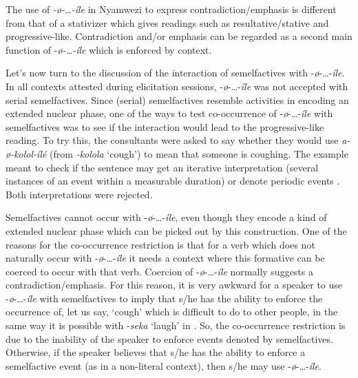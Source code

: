 \documentclass[output=paper,newtxmath,modfonts,nonflat,draftmode]{langsci/langscibook}
\begin{document}
The use of \textit{-ø-…-íle} in Nyamwezi to express contradiction\slash emphasis is different from that of a stativizer which gives readings such as resultative/stative and progressive-like. Contradiction and/or emphasis can be regarded as a second main function of -\textit{ø-…-íle} which is enforced by context. 

Let’s now turn to the discussion of the interaction of semelfactives with -\textit{ø}-…-\textit{íle}. In all contexts attested during elicitation sessions, -\textit{ø}-…-\textit{íle} was not accepted with serial semelfactives. Since (serial) semelfactives resemble activities in encoding an extended nuclear phase, one of the ways to test co-occurrence of -\textit{ø}-…-\textit{íle} with semelfactives was to see if the interaction would lead to the progressive-like reading. To try this, the consultants were asked to say whether they would use \textit{a-ø-kolol-ílé} (from \textit{-kolola} ‘cough’) to mean that someone is coughing. The example meant to check if the sentence may get an iterative interpretation (several instances of an event within a measurable duration)  or denote periodic events . Both interpretations were rejected. 

\ea \label{ex:kanijo:32}

\z
\z


  Semelfactives cannot occur with -\textit{ø}-…-\textit{íle}, even though they encode a kind of extended nuclear phase which can be picked out by this construction. One of the reasons for the co-occurrence restriction is that for a verb which does not naturally occur with -\textit{ø}-…-\textit{íle} it needs a context where this formative can be coerced to occur with that verb. Coercion of -\textit{ø}-…-\textit{íle} normally suggests a contradiction/emphasis. For this reason, it is very awkward for a speaker to use -\textit{ø}-…-\textit{íle} with semelfactives to imply that s/he has the ability to enforce the occurrence of, let us say, ‘cough’ which is difficult to do to other people, in the same way it is possible with -\textit{seka} ‘laugh’ in . So, the co-occurrence restriction is due to the inability of the speaker to enforce events denoted by semelfactives. Otherwise, if the speaker believes that s/he has the ability to enforce a semelfactive event (as in a non-literal context), then s/he may use -\textit{ø}-…-\textit{íle}. 
\end{document}
